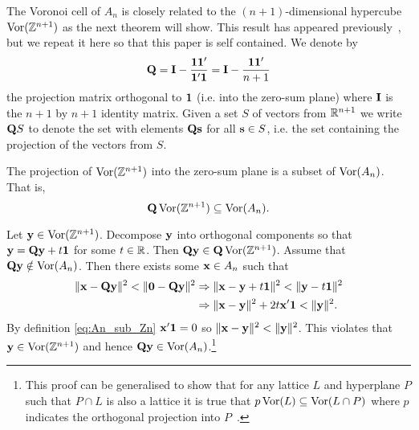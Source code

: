 \documentclass[journal]{IEEEtran}
\begin{document}
The Voronoi cell of $A_n$ is closely related to the $(n+1)$-dimensional hypercube $\operatorname{Vor}({\mathbb Z}^{n+1})$ as the next theorem will show.  This result has appeared previously~\cite{McKilliam2009CoxeterLattices,McKilliam2010thesis}, but we repeat it here so that this paper is self contained.  We denote by
\[
\mathbf{Q} = \mathbf{I} - \frac{\boldsymbol{1}\boldsymbol{1}^\prime}{\boldsymbol{1}^\prime \boldsymbol{1}} = \mathbf{I} - \frac{\boldsymbol{1}\boldsymbol{1}^\prime}{n+1}
\]
the projection matrix orthogonal to $\boldsymbol{1}$ (i.e. into the zero-sum plane) where $\mathbf{I}$ is the $n+1$ by $n+1$ identity matrix.  Given a set $S$ of vectors from ${\mathbb R}^{n+1}$ we write $\mathbf{Q} S$  to denote the set with elements $\mathbf{Q} \mathbf{s}$ for all $\mathbf{s} \in S$, i.e. the set containing the projection of the vectors from $S$.

\begin{lemma} \label{lem:QVorZnsubsetVorAn}
The projection of $\operatorname{Vor}({\mathbb Z}^{n+1})$ into the zero-sum plane is a subset of $\operatorname{Vor}(A_{n})$.  That is,
\[
\mathbf{Q}\operatorname{Vor}({\mathbb Z}^{n+1}) \subseteq \operatorname{Vor}(A_{n}).
\]
\end{lemma}
\begin{IEEEproof}
Let $\mathbf{y} \in \operatorname{Vor}({\mathbb Z}^{n+1})$.  Decompose $\mathbf{y}$ into orthogonal components so that $\mathbf{y} = \mathbf{Q} \mathbf{y} + t \boldsymbol{1}$ for some $t \in {\mathbb R}$.  Then $\mathbf{Q}\mathbf{y} \in \mathbf{Q}\operatorname{Vor}({\mathbb Z}^{n+1})$.  Assume that $\mathbf{Q}\mathbf{y} \notin \operatorname{Vor}(A_n)$.  Then there exists some $\mathbf{x} \in A_n$ such that
\begin{align*}
\|\mathbf{x} - \mathbf{Q}\mathbf{y}\|^2 < \|\boldsymbol{0} - \mathbf{Q}\mathbf{y}\|^2 & \Rightarrow \|\mathbf{x} - \mathbf{y} + t\boldsymbol{1}\|^2 < \|\mathbf{y} - t\boldsymbol{1}\|^2 \\
& \Rightarrow \|\mathbf{x} - \mathbf{y}\|^2 + 2t\mathbf{x}'\boldsymbol{1} < \|\mathbf{y}\|^2.
\end{align*}
By definition \eqref{eq:An_sub_Zn} $\mathbf{x}'\boldsymbol{1} = 0$ so $\|\mathbf{x} - \mathbf{y}\|^2 < \|\mathbf{y}\|^2$.  This violates that $\mathbf{y} \in \operatorname{Vor}({\mathbb Z}^{n+1})$ and hence $\mathbf{Q}\mathbf{y} \in \operatorname{Vor}(A_n)$.\footnote{This proof can be generalised to show that for any lattice $L$ and hyperplane $P$ such that $P\cap L$ is also a lattice it is true that $p\operatorname{Vor}(L) \subseteq \operatorname{Vor}(L \cap P)$ where $p$ indicates the orthogonal projection into $P$~\cite[Lemma~2.1]{McKilliam2010thesis}.}
\end{IEEEproof}
\end{document}
